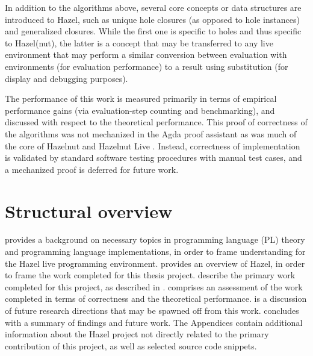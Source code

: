 In addition to the algorithms above, several core concepts or data structures are introduced to Hazel, such as unique hole closures (as opposed to hole instances) and generalized closures. While the first one is specific to holes and thus specific to Hazel(nut), the latter is a concept that may be transferred to any live environment that may perform a similar conversion between evaluation with environments (for evaluation performance) to a result using substitution (for display and debugging purposes).

The performance of this work is measured primarily in terms of empirical performance gains (via evaluation-step counting and benchmarking), and discussed with respect to the theoretical performance. This proof of correctness of the algorithms was not mechanized in the Agda proof assistant as was much of the core of Hazelnut \cite{conf/popl/Hazelnut17} and Hazelnut Live \cite{conf/popl/HazelnutLive19}. Instead, correctness of implementation is validated by standard software testing procedures with manual test cases, and a mechanized proof is deferred for future work.

\section{Structural overview}
\label{sec:structural_overview}

 provides a background on necessary topics in programming language (PL) theory and programming language implementations, in order to frame understanding for the Hazel live programming environment.  provides an overview of Hazel, in order to frame the work completed for this thesis project.  describe the primary work completed for this project, as described in .  comprises an assessment of the work completed in terms of correctness and the theoretical performance.  is a discussion of future research directions that may be spawned off from this work.  concludes with a summary of findings and future work. The Appendices contain additional information about the Hazel project not directly related to the primary contribution of this project, as well as selected source code snippets.

